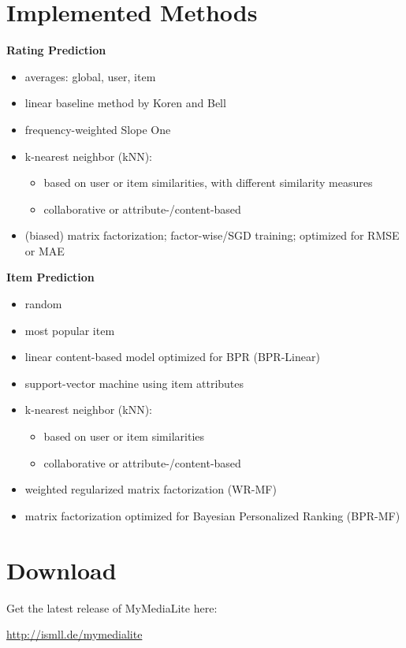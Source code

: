 \documentclass[a4paper, foldmark, 12pt]{leaflet}
\begin{document}
\newpage 

\section{Implemented Methods}
\textbf{Rating Prediction}
\begin{itemize}
	\item averages: global, user, item
	\item linear baseline method by Koren and Bell
        \item frequency-weighted Slope One
	\item k-nearest neighbor (kNN):
		\begin{itemize}
			\item based on user or item similarities, with different similarity measures
			\item collaborative or attribute-/content-based
		\end{itemize}
	\item (biased) matrix factorization; factor-wise/SGD training; optimized for RMSE or MAE
\end{itemize}

\textbf{Item Prediction}
\begin{itemize}
	\item random
	\item most popular item
	\item linear content-based model optimized for BPR (BPR-Linear)
	\item support-vector machine using item attributes
	\item k-nearest neighbor (kNN):
		\begin{itemize}
			\item based on user or item similarities
			\item collaborative or attribute-/content-based
		\end{itemize}
	\item weighted regularized matrix factorization (WR-MF)
	\item matrix factorization optimized for Bayesian Personalized Ranking (BPR-MF)
\end{itemize}

\newpage

\section{Download}
Get the latest release of MyMediaLite here:
\begin{center}
	\url{http://ismll.de/mymedialite}
\end{center}
\end{document}
